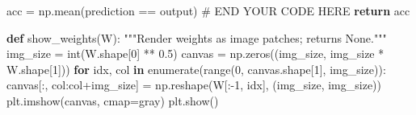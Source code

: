 \documentclass[
  letterpaper,
  DIV=11,
  numbers=noendperiod]{scrartcl}
\newenvironment{Shaded}{\begin{snugshade}}{\end{snugshade}}
\newcommand{\BuiltInTok}[1]{\textcolor[rgb]{0.00,0.23,0.31}{#1}}
\newcommand{\CommentTok}[1]{\textcolor[rgb]{0.37,0.37,0.37}{#1}}
\newcommand{\ControlFlowTok}[1]{\textcolor[rgb]{0.00,0.23,0.31}{\textbf{#1}}}
\newcommand{\DecValTok}[1]{\textcolor[rgb]{0.68,0.00,0.00}{#1}}
\newcommand{\FloatTok}[1]{\textcolor[rgb]{0.68,0.00,0.00}{#1}}
\newcommand{\KeywordTok}[1]{\textcolor[rgb]{0.00,0.23,0.31}{\textbf{#1}}}
\newcommand{\NormalTok}[1]{\textcolor[rgb]{0.00,0.23,0.31}{#1}}
\newcommand{\OperatorTok}[1]{\textcolor[rgb]{0.37,0.37,0.37}{#1}}
\newcommand{\RegionMarkerTok}[1]{\textcolor[rgb]{0.00,0.23,0.31}{#1}}
\newcommand{\StringTok}[1]{\textcolor[rgb]{0.13,0.47,0.30}{#1}}
\begin{document}
\begin{Shaded}
\begin{Highlighting}[]
\NormalTok{    acc }\OperatorTok{=}\NormalTok{ np.mean(prediction }\OperatorTok{==}\NormalTok{ output)}
    \CommentTok{\# }\RegionMarkerTok{END}\CommentTok{ YOUR CODE HERE}
    \ControlFlowTok{return}\NormalTok{ acc}
            
\KeywordTok{def}\NormalTok{ show\_weights(W):}
    \CommentTok{"""Render weights as image patches; returns None."""}
\NormalTok{    img\_size }\OperatorTok{=} \BuiltInTok{int}\NormalTok{(W.shape[}\DecValTok{0}\NormalTok{] }\OperatorTok{**} \FloatTok{0.5}\NormalTok{)}
\NormalTok{    canvas }\OperatorTok{=}\NormalTok{ np.zeros((img\_size, img\_size }\OperatorTok{*}\NormalTok{ W.shape[}\DecValTok{1}\NormalTok{]))}
    \ControlFlowTok{for}\NormalTok{ idx, col }\KeywordTok{in} \BuiltInTok{enumerate}\NormalTok{(}\BuiltInTok{range}\NormalTok{(}\DecValTok{0}\NormalTok{, canvas.shape[}\DecValTok{1}\NormalTok{], img\_size)):}
\NormalTok{        canvas[:, col:col}\OperatorTok{+}\NormalTok{img\_size] }\OperatorTok{=}\NormalTok{ np.reshape(W[:}\OperatorTok{{-}}\DecValTok{1}\NormalTok{, idx], (img\_size, img\_size))}
\NormalTok{    plt.imshow(canvas, cmap}\OperatorTok{=}\StringTok{\textquotesingle{}gray\textquotesingle{}}\NormalTok{)}
\NormalTok{    plt.show()}
\end{Highlighting}
\end{Shaded}
\end{document}
